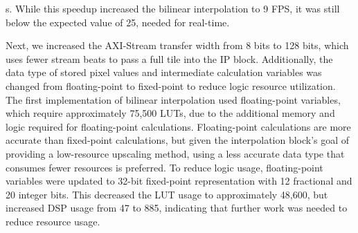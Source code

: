 \documentclass{article}
\begin{document}
\textmu s. While this speedup increased the bilinear interpolation to 9 FPS, it was still below the expected value of 25, needed for real-time. 
                \par Next, we increased the AXI-Stream transfer width from 8 bits to 128 bits, which uses fewer stream beats to pass a full tile into the IP block. Additionally, the data type of stored pixel values and intermediate calculation variables was changed from floating-point to fixed-point to reduce logic resource utilization. The first implementation of bilinear interpolation used floating-point variables, which require approximately 75,500 LUTs, due to the additional memory and logic required for floating-point calculations. Floating-point calculations are more accurate than fixed-point calculations, but given the interpolation block’s goal of providing a low-resource upscaling method, using a less accurate data type that consumes fewer resources is preferred. To reduce logic usage, floating-point variables were updated to 32-bit fixed-point representation with 12 fractional and 20 integer bits. This decreased the LUT usage to approximately 48,600, but increased DSP usage from 47 to 885, indicating that further work was needed to reduce resource usage.
\end{document}

